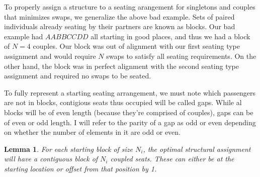 \documentclass[a4paper]{article}
\newtheorem{lem}{Lemma}[section]
\begin{document}
To properly assign a structure to a seating arangement for singletons and couples that minimizes swaps, we generalize the above bad example.  Sets of paired individuals already seating by their partners are known as blocks.  Our bad example had $AABBCCDD$ all starting in good places, and thus we had a block of $N = 4$ couples.  Our block was out of alignment with our first seating type assignment and would require $N$ swaps to satisfy all seating requirements.  On the other hand, the block was in perfect alignment with the second seating type assignment and required no swaps to be seated.

\begin{figure}[H]
\centering
{}
\end{figure}

To fully represent a starting seating arrangement, we must note which passengers are not in blocks, contigious seats thus occupied will be called gaps.  While al blocks will be of even length (because they're comprised of couples), gaps can be of even or odd length.  I will refer to the parity of a gap as odd or even depending on whether the number of elements in it are odd or even.

\begin{lem} \label{lemma:ParityOnly}
For each starting block of size $N_i$, the optimal structural assignment will have a contiguous block of $N_i$ coupled seats. These can either be at the starting location or offset from that position by 1.
\end{lem}
\end{document}
